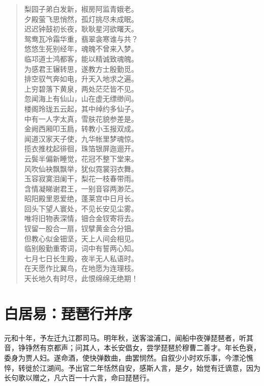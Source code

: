 \documentclass[12pt,oneside]{book}
\newenvironment{shici}{
\begin{verse}
\centering\large\hspace{12pt}}
{\end{verse}}
\begin{document}
\begin{shici}
梨园子弟白发新，椒房阿监青娥老。\\
夕殿萤飞思悄然，孤灯挑尽未成眠。\\
迟迟钟鼓初长夜，耿耿星河欲曙天。\\
鸳鸯瓦冷霜华重，翡翠衾寒谁与共？\\
悠悠生死别经年，魂魄不曾来入梦。\\
临邛道士鸿都客，能以精诚致魂魄。\\
为感君王辗转思，遂教方士殷勤觅。\\
排空驭气奔如电，升天入地求之遍。\\
上穷碧落下黄泉，两处茫茫皆不见。\\
忽闻海上有仙山，山在虚无缥缈间。\\
楼阁玲珑五云起，其中绰约多仙子。\\
中有一人字太真，雪肤花貌参差是。\\
金阙西厢叩玉扃，转教小玉报双成。\\
闻道汉家天子使，九华帐里梦魂惊。\\
揽衣推枕起徘徊，珠箔银屏迤逦开。\\
云鬓半偏新睡觉，花冠不整下堂来。\\
风吹仙袂飘飘举，犹似霓裳羽衣舞。\\
玉容寂寞泪阑干，梨花一枝春带雨。\\
含情凝睇谢君王，一别音容两渺茫。\\
昭阳殿里恩爱绝，蓬莱宫中日月长。\\
回头下望人寰处，不见长安见尘雾。\\
唯将旧物表深情，钿合金钗寄将去。\\
钗留一股合一扇，钗擘黄金合分钿。\\
但教心似金钿坚，天上人间会相见。\\
临别殷勤重寄词，词中有誓两心知。\\
七月七日长生殿，夜半无人私语时。\\
在天愿作比翼鸟，在地愿为连理枝。\\
天长地久有时尽，此恨绵绵无绝期！
\end{shici}

\chapter{白居易：琵琶行并序}
元和十年，予左迁九江郡司马。明年秋，送客湓浦口，闻船中夜弹琵琶者，听其音，铮铮然有京都声；问其人，本长安倡女，尝学琵琶於穆曹二善才。年长色衰，委身为贾人妇。遂命酒，使快弹数曲，曲罢悯然。自叙少小时欢乐事，今漂沦憔悴，转徙於江湖间。予出官二年恬然自安，感斯人言，是夕，始觉有迁谪意，因为长句歌以赠之，凡六百一十六言，命曰琵琶行。
\end{document}
